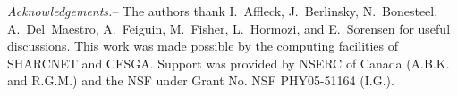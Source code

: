 \documentclass[prl,aps,twocolumn,floatfix,amsmath,amssymb,superscriptaddress,tightenlines]{revtex4}
\begin{document}

{\it Acknowledgements.}-- The authors thank I.~Affleck, J.~Berlinsky,
N.~Bonesteel,
A.~Del~Maestro, A.~Feiguin, M.~Fisher, L.~Hormozi, and E.~Sorensen for useful
discussions.  This work was made possible by the computing facilities of
SHARCNET and CESGA.  Support was provided by NSERC of
Canada (A.B.K. and R.G.M.) and the NSF under Grant No. NSF PHY05-51164 (I.G.).


\end{document}
